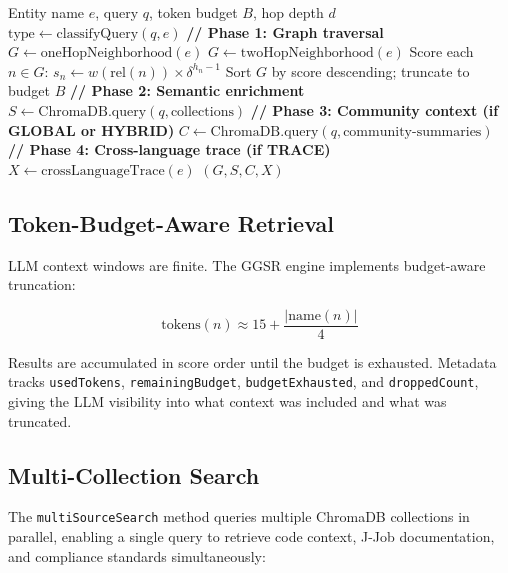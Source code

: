 \documentclass[11pt,letterpaper]{article}
\begin{document}
\begin{algorithm}[H]
\caption{Graph-Guided Semantic Retrieval}
\label{alg:ggsr}
\begin{algorithmic}[1]
\REQUIRE Entity name $e$, query $q$, token budget $B$, hop depth $d$
\STATE $\text{type} \leftarrow \text{classifyQuery}(q, e)$
\STATE \textbf{// Phase 1: Graph traversal}
    \STATE $G \leftarrow \text{oneHopNeighborhood}(e)$
\ELSE
    \STATE $G \leftarrow \text{twoHopNeighborhood}(e)$
\ENDIF
\STATE Score each $n \in G$: $s_n \leftarrow w(\text{rel}(n)) \times \delta^{h_n - 1}$
\STATE Sort $G$ by score descending; truncate to budget $B$
\STATE \textbf{// Phase 2: Semantic enrichment}
\STATE $S \leftarrow \text{ChromaDB.query}(q, \text{collections})$
\STATE \textbf{// Phase 3: Community context (if GLOBAL or HYBRID)}
    \STATE $C \leftarrow \text{ChromaDB.query}(q, \text{community-summaries})$
\ENDIF
\STATE \textbf{// Phase 4: Cross-language trace (if TRACE)}
    \STATE $X \leftarrow \text{crossLanguageTrace}(e)$
\ENDIF
\RETURN $(G, S, C, X)$ 
\end{algorithmic}
\end{algorithm}

\subsection{Token-Budget-Aware Retrieval}

LLM context windows are finite. The GGSR engine implements
budget-aware truncation:

\begin{equation}
\label{eq:budget}
\text{tokens}(n) \approx 15 + \frac{|\text{name}(n)|}{4}
\end{equation}

Results are accumulated in score order until the budget is exhausted.
Metadata tracks \texttt{usedTokens}, \texttt{remainingBudget},
\texttt{budgetExhausted}, and \texttt{droppedCount}, giving the LLM
visibility into what context was included and what was truncated.

\subsection{Multi-Collection Search}

The \texttt{multiSourceSearch} method queries multiple ChromaDB
collections in parallel, enabling a single query to retrieve code
context, J-Job documentation, and compliance standards simultaneously:
\end{document}
